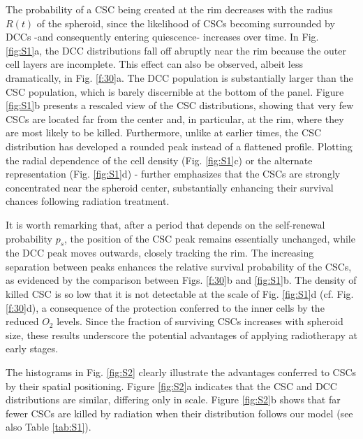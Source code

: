 \documentclass[10pt,letterpaper]{article}
\begin{document}
The probability of a CSC being created at the rim decreases with the radius $R(t)$ of the spheroid, since the likelihood of CSCs becoming surrounded by DCCs -and consequently entering quiescence- increases over time. In Fig. \ref*{fig:S1}a, the DCC distributions fall off abruptly near the rim because the outer cell layers are incomplete. This effect can also be observed, albeit less dramatically, in Fig. \ref{f:30}a. The DCC population is substantially larger than the CSC population, which is barely discernible at the bottom of the panel. Figure \ref{fig:S1}b presents a rescaled view of the CSC distributions, showing that very few CSCs are located far from the center and, in particular, at the rim, where they are most likely to be killed. Furthermore, unlike at earlier times, the CSC distribution has developed a rounded peak instead of a flattened profile. Plotting the radial dependence of the cell density (Fig. \ref{fig:S1}c) or the alternate representation (Fig. \ref{fig:S1}d) - further emphasizes that the CSCs are strongly concentrated near the spheroid center, substantially enhancing their survival chances following radiation treatment. 

It is worth remarking that, after a period that depends on the self-renewal probability $p_s$, the position of the CSC peak remains essentially unchanged, while the DCC peak moves outwards, closely tracking the rim. The increasing separation between peaks enhances the relative survival probability of the CSCs, as evidenced by the comparison between Figs. \ref{f:30}b and \ref{fig:S1}b. The density of killed CSC is so low that it is not detectable at the scale of Fig. \ref{fig:S1}d (cf. Fig. \ref{f:30}d), a consequence of the protection conferred to the inner cells by the reduced $O_2$ levels. Since the fraction of surviving CSCs increases with spheroid size, these results underscore the potential advantages of applying radiotherapy at early stages. 

The histograms in Fig. \ref{fig:S2} clearly illustrate the advantages conferred to CSCs by their spatial positioning. Figure \ref{fig:S2}a indicates that the CSC and DCC distributions are similar, differing only in scale. Figure \ref{fig:S2}b shows that far fewer CSCs are killed by radiation when their distribution follows our model (see also Table \ref{tab:S1}).

\end{document}
